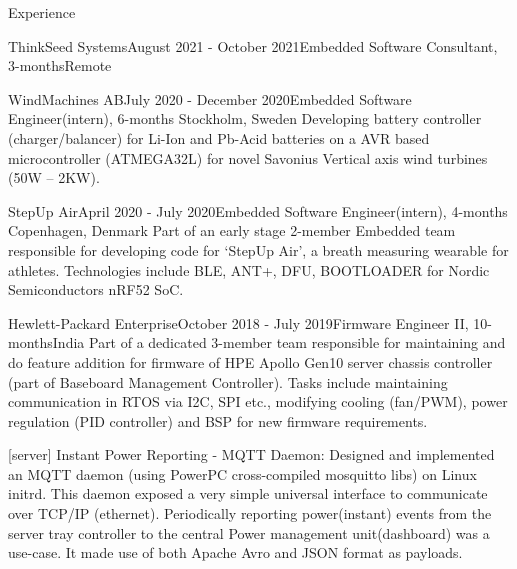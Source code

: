 \documentclass[
	a4paper, %
	11pt, %
]{resume} %
\begin{document}
\begin{rSection}{Experience}
\begin{rSubsection}{ThinkSeed Systems}{August 2021 - October 2021}{Embedded Software Consultant, 3-months}{Remote}
		
	\end{rSubsection}


	\begin{rSubsection}{WindMachines AB}{July 2020 - December 2020}{Embedded Software Engineer(intern), 6-months}{ Stockholm, Sweden}
            Developing battery controller (charger/balancer) for Li-Ion and Pb-Acid batteries on a AVR based microcontroller (ATMEGA32L) for novel Savonius Vertical axis wind turbines (50W – 2KW).

	\end{rSubsection}
 

	\begin{rSubsection}{StepUp Air}{April 2020 - July 2020}{Embedded Software Engineer(intern), 4-months}{ Copenhagen, Denmark}
            Part of an early stage 2-member Embedded team responsible for developing code for ‘StepUp Air’, a breath measuring wearable for athletes. Technologies include BLE, ANT+, DFU, BOOTLOADER for Nordic Semiconductors nRF52 SoC.

	\end{rSubsection}
 

	\begin{rSubsection}{Hewlett-Packard Enterprise}{October 2018 - July 2019}{Firmware Engineer II, 10-months}{India}
            Part of a dedicated 3-member team responsible for maintaining and do feature addition for firmware of HPE Apollo Gen10 server chassis controller (part of Baseboard Management Controller). Tasks include maintaining communication in RTOS via I2C, SPI etc., modifying cooling (fan/PWM), power regulation (PID controller) and BSP for new firmware requirements.

            [server] Instant Power Reporting - MQTT Daemon: Designed and implemented an MQTT daemon (using PowerPC cross-compiled mosquitto libs) on Linux initrd. This daemon exposed a very simple universal interface to communicate over TCP/IP (ethernet). Periodically reporting power(instant) events from the server tray controller to the central Power management unit(dashboard) was a use-case. It made use of both Apache Avro and JSON format as payloads.
            

\end{rSubsection}
\end{rSection}
\end{document}
